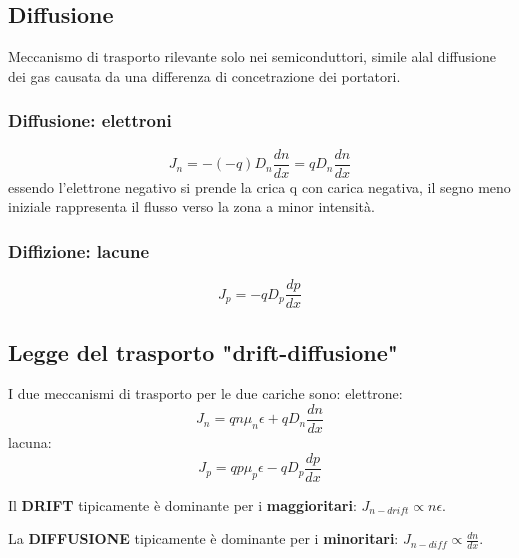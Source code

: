 \subsection{Diffusione}
Meccanismo di trasporto rilevante solo nei semiconduttori, simile alal diffusione dei gas causata da una
differenza di concetrazione dei portatori.

\subsubsection{Diffusione: elettroni}
 \begin{equation}
     J_n=-(-q)D_n\frac{dn}{dx} = qD_n\frac{dn}{dx}
 \end{equation}
essendo l'elettrone negativo si prende la crica q con carica negativa, il segno meno iniziale rappresenta
il flusso verso la zona a minor intensità.

\subsubsection{Diffizione: lacune}
\begin{equation}
    J_p=-qD_p\frac{dp}{dx}
\end{equation}


\subsection{Legge del trasporto "drift-diffusione"}

I due meccanismi di trasporto per le due cariche sono:
elettrone:
\begin{equation}
    J_n= qn\mu_n\epsilon + qD_n\frac{dn}{dx}
\end{equation}
lacuna:
\begin{equation}
    J_p= qp\mu_p\epsilon - qD_p\frac{dp}{dx}
\end{equation}

Il \textbf{DRIFT} tipicamente è dominante per i \textbf{maggioritari}: $J_{n-drift} \propto n\epsilon$.


La \textbf{DIFFUSIONE} tipicamente è dominante per i \textbf{minoritari}: $J_{n-diff} \propto \frac{dn}{dx}$.


